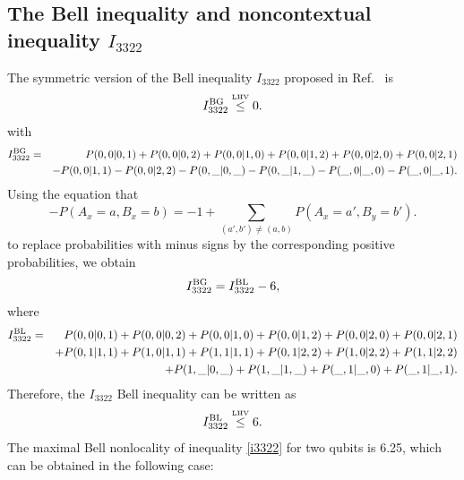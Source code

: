 \documentclass[pra,aps,notitlepage,superscriptaddress,showpacs,showkeys]{revtex4-1}
\theoremstyle{definition}
\theoremstyle{remark}
\begin{document}
\subsection{The Bell inequality and noncontextual inequality $I_{3322}$}
The symmetric version of the Bell inequality $I_{3322}$ proposed in Ref.~\cite{BG08} is
\begin{equation}
 I_{3322}^{\rm BG} \stackrel{\mbox{\tiny{LHV}}}{\leq} 0.
\end{equation}
with
\begin{eqnarray}
 I_{3322}^{\rm BG} &=&P(0,0 \vert 0,1) + P(0,0 \vert 0,2) + P(0,0 \vert 1,0)+ P(0,0 \vert 1,2) + P(0,0 \vert 2,0) + P(0,0 \vert 2,1) \nonumber \\
                    &&- P(0,0 \vert 1,1) - P(0,0 \vert 2,2) - P(0,\_ \vert 0,\_) - P(0,\_ \vert 1,\_) - P(\_,0 \vert \_,0) - P(\_,0 \vert \_,1).
                    \label{I3322BG}
\end{eqnarray}
Using the equation that
\begin{equation}
-P(A_x=a,B_x=b)=-1+\sum_{(a',b') \neq (a,b)} P(A_x=a',B_y=b').
\label{transformations}
\end{equation}
to replace probabilities with minus signs by the corresponding positive probabilities, we obtain
\begin{equation}
 I_{3322}^{\rm BG} = I_{3322}^{\rm BL} - 6,
\end{equation}
where
\begin{eqnarray}
 I_{3322}^{\rm BL}
 &=&P(0,0 \vert 0,1) + P(0,0 \vert 0,2) + P(0,0 \vert 1,0)+ P(0,0 \vert 1,2) + P(0,0 \vert 2,0) + P(0,0 \vert 2,1) \nonumber \\
 &&+ P(0,1 \vert 1,1) + P(1,0 \vert 1,1) + P(1,1 \vert 1,1)+ P(0,1 \vert 2,2) + P(1,0 \vert 2,2) + P(1,1 \vert 2,2) \nonumber \\
 &&+ P(1,\_ \vert 0,\_) +P(1,\_ \vert 1,\_) + P(\_,1 \vert \_,0) + P(\_,1 \vert \_,1).
\label{I3322CSW}
\end{eqnarray}
Therefore, the $I_{3322}$ Bell inequality can be written as
\begin{equation}
 I_{3322}^{\rm BL} \stackrel{\mbox{\tiny{LHV}}}{\leq} 6.\label{i3322}
\end{equation}
The maximal Bell nonlocality of inequality \eqref{i3322} for two qubits is 6.25, which can be  obtained in the following case:
\end{document}
